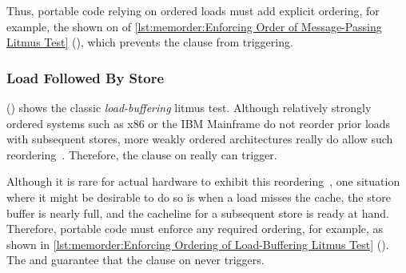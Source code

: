 \begin{listing}[tbp]

\caption{Enforcing Order of Message-Passing Litmus Test}
\label{lst:memorder:Enforcing Order of Message-Passing Litmus Test}
\end{listing}

\begin{fcvref}
Thus, portable code relying on ordered loads must
add explicit ordering, for example, the  shown on
 of
\cref{lst:memorder:Enforcing Order of Message-Passing Litmus Test}
(), which prevents
the  clause from triggering.
\end{fcvref}

\begin{listing}[tbp]

\caption{Load-Buffering Litmus Test (No Ordering)}
\label{lst:memorder:Load-Buffering Litmus Test (No Ordering)}
\end{listing}

\subsubsection{Load Followed By Store}
\label{sec:memorder:Load Followed By Store}

\begin{fcvref}
()
shows the classic \emph{load-buffering} litmus test.
Although relatively strongly ordered systems such as x86
or the IBM Mainframe do not reorder prior loads with subsequent stores,
more weakly ordered architectures really do allow such
reordering~\cite{JadeAlglave2011ppcmem}.
Therefore, the  clause on  really can trigger.
\end{fcvref}

\begin{listing}[tbp]

\caption{Enforcing Ordering of Load-Buffering Litmus Test}
\label{lst:memorder:Enforcing Ordering of Load-Buffering Litmus Test}
\end{listing}

\begin{fcvref}
Although it is rare for actual hardware to
exhibit this reordering~\cite{LucMaranget2017aarch64},
one situation where it might be desirable to do so is when a load
misses the cache, the store buffer is nearly full, and the cacheline for
a subsequent store is ready at hand.
Therefore, portable code must enforce any required ordering, for example,
as shown in
\cref{lst:memorder:Enforcing Ordering of Load-Buffering Litmus Test}
().
The  and  guarantee that
the  clause on  never triggers.
\end{fcvref}

